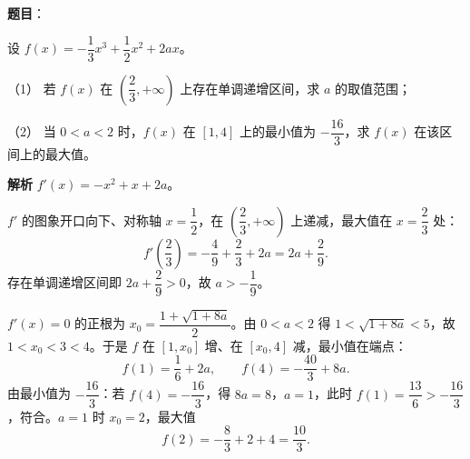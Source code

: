 \begin{answer}

\textbf{题目}：

设 $f(x)=-\dfrac13x^3+\dfrac12x^2+2ax$。

（1） 若 $f(x)$ 在 $\left(\dfrac23,+\infty\right)$ 上存在单调递增区间，求 $a$ 的取值范围；

（2） 当 $0<a<2$ 时，$f(x)$ 在 $[1,4]$ 上的最小值为 $-\dfrac{16}3$，求 $f(x)$ 在该区间上的最大值。

\textbf{解析}
$f'(x)=-x^2+x+2a$。

$f'$ 的图象开口向下、对称轴 $x=\dfrac12$，在 $\left(\dfrac23,+\infty\right)$ 上递减，最大值在 $x=\dfrac23$ 处：
\nopagebreak[4]
\[f'\left(\frac23\right)=-\frac49+\frac23+2a=2a+\frac29.\]
存在单调递增区间即 $2a+\dfrac29>0$，故 $a>-\dfrac19$。

$f'(x)=0$ 的正根为 $x_0=\dfrac{1+\sqrt{1+8a}}2$。由 $0<a<2$ 得 $1<\sqrt{1+8a}<5$，故 $1<x_0<3<4$。于是 $f$ 在 $[1,x_0]$ 增、在 $[x_0,4]$ 减，最小值在端点：
\nopagebreak[4]
\[f(1)=\frac16+2a,\qquad f(4)=-\frac{40}3+8a.\]
由最小值为 $-\dfrac{16}3$：若 $f(4)=-\dfrac{16}3$，得 $8a=8$，$a=1$，此时 $f(1)=\dfrac{13}6>-\dfrac{16}3$，符合。$a=1$ 时 $x_0=2$，最大值
\nopagebreak[4]
\[f(2)=-\frac83+2+4=\frac{10}3.\]



\end{answer}
